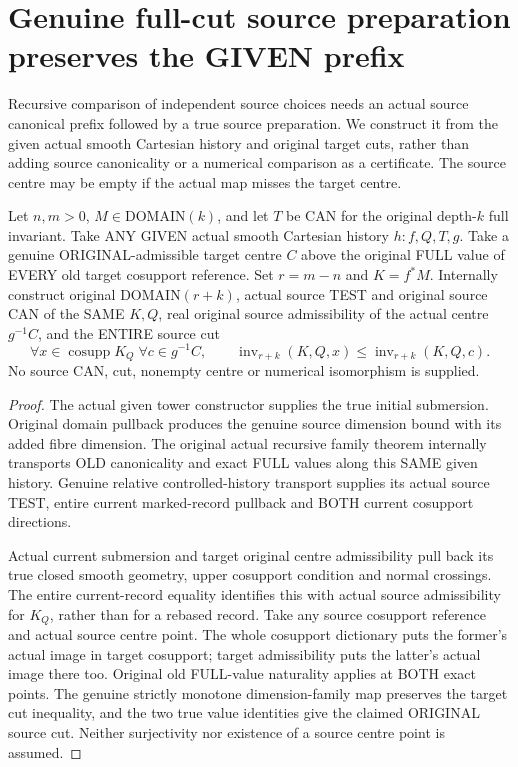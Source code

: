 \section{Genuine full-cut source preparation preserves the GIVEN prefix}

Recursive comparison of independent source choices needs an actual source
canonical prefix followed by a true source preparation. We construct it from
the given actual smooth Cartesian history and original target cuts, rather
than adding source canonicality or a numerical comparison as a certificate.
The source centre may be empty if the actual map misses the target centre.

\begin{theorem}
\label{hir:original-full-cut-genuine-source-preparation-data}
\leanok
Let $n,m>0$, $M\in\mathrm{DOMAIN}(k)$, and let $T$ be CAN for the original
depth-$k$ full invariant. Take ANY GIVEN actual smooth Cartesian history
$h:f,Q,T,g$. Take a genuine ORIGINAL-admissible target centre $C$ above the
original FULL value of EVERY old target cosupport reference. Set
$r=m-n$ and $K=f^*M$. Internally construct original DOMAIN$(r+k)$, actual
source TEST and original source CAN of the SAME $K,Q$, real original source
admissibility of the actual centre $g^{-1}C$, and the ENTIRE source cut
\[
 \forall x\in\operatorname{cosupp}K_Q\;\forall c\in g^{-1}C,\qquad
 \operatorname{inv}_{r+k}(K,Q,x)\le\operatorname{inv}_{r+k}(K,Q,c).
\]
No source CAN, cut, nonempty centre or numerical isomorphism is supplied.
\end{theorem}
\begin{proof}
The actual given tower constructor supplies the true initial submersion.
Original domain pullback produces the genuine source dimension bound with
its added fibre dimension. The original actual recursive family theorem
internally transports OLD canonicality and exact FULL values along this
SAME given history. Genuine relative controlled-history transport supplies
its actual source TEST, entire current marked-record pullback and BOTH
current cosupport directions.

Actual current submersion and target original centre admissibility pull
back its true closed smooth geometry, upper cosupport condition and normal
crossings. The entire current-record equality identifies this with actual
source admissibility for $K_Q$, rather than for a rebased record.
Take any source cosupport reference and actual source centre point. The
whole cosupport dictionary puts the former's actual image in target
cosupport; target admissibility puts the latter's actual image there too.
Original old FULL-value naturality applies at BOTH exact points. The genuine
strictly monotone dimension-family map preserves the target cut inequality,
and the two true value identities give the claimed ORIGINAL source cut.
Neither surjectivity nor existence of a source centre point is assumed.
\end{proof}

